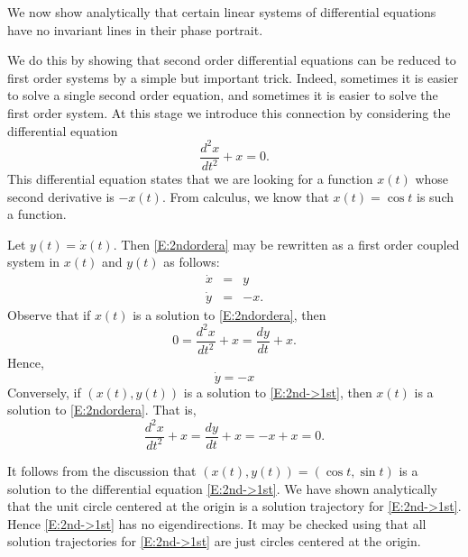 \documentclass{ximera}
\begin{document}
We now show analytically that certain linear systems of
differential equations have no invariant lines in their phase portrait.

We do this by showing that second order differential equations can be
reduced to first order systems by a simple but important trick.  Indeed,
sometimes it is easier to solve a single second order equation, and
sometimes it is easier to solve the first order system.  At this stage
we introduce this connection by considering the differential equation
\begin{equation}  \label{E:2ndordera}
\frac{d^2x}{dt^2} + x = 0.
\end{equation}
This differential equation states that we are looking for a function
$x(t)$ whose second derivative is $-x(t)$.  From calculus, we know
that $x(t)=\cos t$ is such a function.

Let $y(t)=\dot{x}(t)$.  Then
\eqref{E:2ndordera} may be rewritten as a first order coupled system
in $x(t)$ and $y(t)$ as follows:
\begin{equation}  \label{E:2nd->1st}
\begin{array}{rcl}
\dot{x} & = & y \\
\dot{y} & = & -x.
\end{array}
\end{equation}
Observe that if $x(t)$ is a solution to \eqref{E:2ndordera}, then
\[
0 = \frac{d^2x}{dt^2} + x = \frac{dy}{dt} + x.
\]
Hence,
\[
\dot{y} = -x
\]
Conversely, if $(x(t),y(t))$ is a solution to \eqref{E:2nd->1st}, then
$x(t)$ is a solution to \eqref{E:2ndordera}.  That is,
\[
\frac{d^2x}{dt^2} + x = \frac{dy}{dt} + x = -x + x = 0.
\]

It follows from the discussion that $(x(t),y(t))=(\cos t,\sin t)$ is 
a solution to the differential equation \eqref{E:2nd->1st}.  We have shown 
analytically that the unit circle centered at the origin is a solution 
trajectory for \eqref{E:2nd->1st}.  Hence \eqref{E:2nd->1st} has no 
eigendirections.  It may be checked using \Matlab that all solution 
trajectories for \eqref{E:2nd->1st} are just circles centered at the origin.


\EXER

\CEXER
\end{document}
